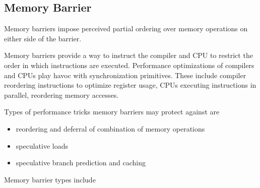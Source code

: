 \documentclass{article}
\begin{document}
\subsection{Memory Barrier}

Memory barriers impose perceived partial ordering over memory
operations on either side of the barrier.

Memory barriers provide a way to instruct the compiler and CPU to
restrict the order in which instructions are executed. Performance
optimizations of compilers and CPUs play havoc with synchronization
primitives. These include compiler reordering instructions to optimize
register usage, CPUs executing instructions in parallel, reordering
memory accesses.


Types of performance tricks memory barriers may protect against are
\begin{itemize}
\item reordering and deferral of combination of memory operations
\item speculative loads
\item speculative branch prediction and caching
\end{itemize}

Memory barrier types include
\end{document}
